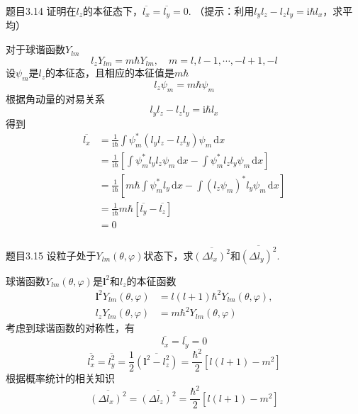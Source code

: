 \begin{question}{题目3.14}
    证明在$l_z$的本征态下，$\overline{l_x}=\overline{l_y}=0$. （提示：利用$l_yl_z-l_zl_y=\mathrm{i}\hbar l_x$，求平均）
\end{question}
\begin{solution}
    对于球谐函数$Y_{lm}$
    $$
        l_zY_{lm} = m\hbar Y_{lm}, \quad m = l, l-1, \cdots, -l+1, -l
    $$
    设$\psi_m$是$l_z$的本征态，且相应的本征值是$m\hbar$
    $$
        l_z\psi_m = m\hbar\psi_m
    $$
    根据角动量的对易关系
    $$
        l_yl_z-l_zl_y=\mathrm{i}\hbar l_x
    $$
    得到
    $$
        \begin{aligned}
            \overline{l_x}
             & = \frac{1}{\mathrm{i}\hbar}\int\psi_m^*\left(l_yl_z - l_zl_y\right)\psi_m \,\mathrm{d}x                                          \\
             & = \frac{1}{\mathrm{i}\hbar}\left[\int\psi_m^*l_yl_z\psi_m\,\mathrm{d}x - \int\psi_m^*l_zl_y\psi_m \,\mathrm{d}x\right]           \\
             & = \frac{1}{\mathrm{i}\hbar}\left[m\hbar\int\psi_m^*l_y\,\mathrm{d}x - \int\left(l_z\psi_m\right)^*l_y\psi_m \,\mathrm{d}x\right] \\
             & = \frac{1}{\mathrm{i}\hbar}m\hbar\left[\overline{l_y} - \overline{l_z}\right]                                                    \\
             & = 0                                                                                                                              \\
        \end{aligned}
    $$
\end{solution}




\begin{question}{题目3.15}
    设粒子处于$Y_{lm}(\theta,\varphi)$状态下，求$\overline{(\Delta l_x)^2}$和$\overline{(\Delta l_y)^2}$.
\end{question}
\begin{solution}
    球谐函数$Y_{lm}(\theta, \varphi)$是$\boldsymbol{l}^2$和$l_z$的本征函数
    $$
        \begin{aligned}
            \boldsymbol{l}^2Y_{lm}(\theta, \varphi) & = l(l+1)\hbar^2Y_{lm}(\theta, \varphi), \\
            l_zY_{lm}(\theta, \varphi)              & = m\hbar^2Y_{lm}(\theta, \varphi)
        \end{aligned}
    $$
    考虑到球谐函数的对称性，有
    $$
        \overline{l_x} = \overline{l_y} = 0
    $$
    $$
        \overline{l_x^2} = \overline{l_y^2} = \frac{1}{2}\overline{\left(\boldsymbol{l}^2-l_z^2\right)} = \frac{\hbar^2}{2}\left[l(l+1)-m^2\right]
    $$
    根据概率统计的相关知识
    $$
        \overline{(\Delta l_x)^2} = \overline{(\Delta l_z)^2} = \frac{\hbar^2}{2}\left[l(l+1)-m^2\right]
    $$
\end{solution}





